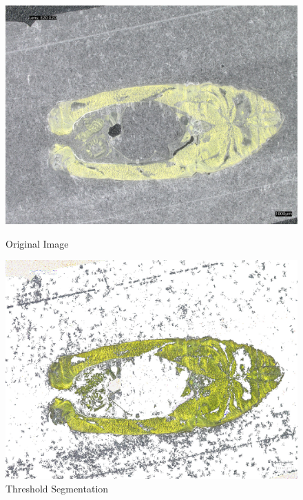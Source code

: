\begin{figure}[H]
    \centering
    \begin{minipage}{0.45\textwidth}
        \centering
        \includegraphics[width=\textwidth]{./fig/model2/origin20240205_161427.jpg}
        \caption{Original Image}
        \label{fig:origin}
    \end{minipage}
    \begin{minipage}{0.45\textwidth}
        \centering
        \includegraphics[width=\textwidth]{./fig/model2/yellow20240205_161427.jpg}
        \caption{Threshold Segmentation}
        \label{fig:yellow}
    \end{minipage}
\end{figure}

